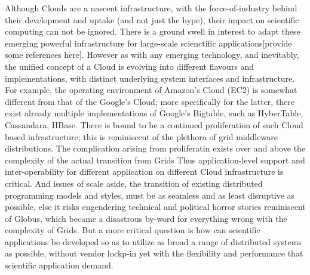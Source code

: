 \documentclass[conference,final]{IEEEtran}
\begin{document}
Although Clouds are a nascent infrastructure, with the
force-of-industry behind their development and uptake (and not just
the hype), their impact on scientific computing can not be ignored.
There is a ground swell in interest to adapt these emerging powerful
infrastructure for large-scale scienctific applications[provide some
references here].
However as with any emerging technology, and inevitably, the unified
concept of a Cloud is evolving into different flavours and
implementations, with distinct underlying system interfaces and
infrastructure. For example, the operating environment of Amazon's
Cloud (EC2) is somewhat different from that of the Google's Cloud;
more specifically for the latter, there exist already multiple
implementations of Google's Bigtable, such as HyberTable, Cassandara,
HBase. There is bound to be a continued proliferation of such Cloud
based infrastructure; this is reminiscent of the plethora of grid
middleware distributions. The complication arising from proliferatin
exists over and above the complexity of the actual transition from
Grids Thus application-level support and inter-operability for
different application on different Cloud infrastructure is
critical. And issues of scale aside, the transition of existing
distributed programming models and styles, must be as seamless and as
least disruptive as possible, else it risks engendering technical and
political horror stories reminiscent of Globus, which became a
disastrous by-word for everything wrong with the complexity of Grids.
But a more critical question is how can scientific applications be
developed so as to utilize as broad a range of distributed systems
as possible, without vendor lockp-in yet with the flexibility
and performance that scientific application demand.
\end{document}
